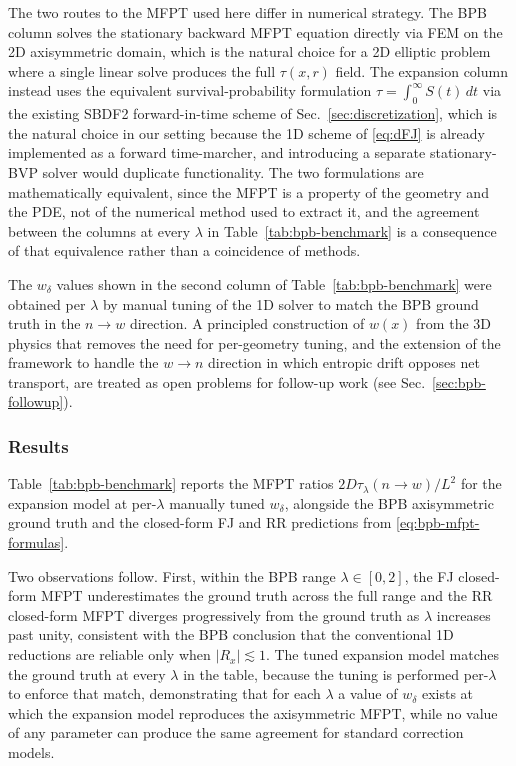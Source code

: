 \documentclass[11pt]{article}
\begin{document}
The two routes to the MFPT used here differ in numerical strategy. The BPB column solves the stationary backward MFPT equation directly via FEM on the 2D axisymmetric domain, which is the natural choice for a 2D elliptic problem where a single linear solve produces the full $\tau(x, r)$ field. The expansion column instead uses the equivalent survival-probability formulation $\tau = \int_0^\infty S(t)\, dt$ via the existing SBDF2 forward-in-time scheme of Sec.~\ref{sec:discretization}, which is the natural choice in our setting because the 1D scheme of \eqref{eq:dFJ} is already implemented as a forward time-marcher, and introducing a separate stationary-BVP solver would duplicate functionality. The two formulations are mathematically equivalent, since the MFPT is a property of the geometry and the PDE, not of the numerical method used to extract it, and the agreement between the columns at every $\lambda$ in Table~\ref{tab:bpb-benchmark} is a consequence of that equivalence rather than a coincidence of methods.

The $w_\delta$ values shown in the second column of Table~\ref{tab:bpb-benchmark} were obtained per $\lambda$ by manual tuning of the 1D solver to match the BPB ground truth in the $n \to w$ direction. A principled construction of $w(x)$ from the 3D physics that removes the need for per-geometry tuning, and the extension of the framework to handle the $w \to n$ direction in which entropic drift opposes net transport, are treated as open problems for follow-up work (see Sec.~\ref{sec:bpb-followup}).

\subsubsection{Results}

Table~\ref{tab:bpb-benchmark} reports the MFPT ratios $2D \tau_\lambda(n \to w)/L^2$ for the expansion model at per-$\lambda$ manually tuned $w_\delta$, alongside the BPB axisymmetric ground truth and the closed-form FJ and RR predictions from \eqref{eq:bpb-mfpt-formulas}.

Two observations follow. First, within the BPB range $\lambda \in [0, 2]$, the FJ closed-form MFPT underestimates the ground truth across the full range and the RR closed-form MFPT diverges progressively from the ground truth as $\lambda$ increases past unity, consistent with the BPB conclusion that the conventional 1D reductions are reliable only when $|R_x| \lesssim 1$. The tuned expansion model matches the ground truth at every $\lambda$ in the table, because the tuning is performed per-$\lambda$ to enforce that match, demonstrating that for each $\lambda$ a value of $w_\delta$ exists at which the expansion model reproduces the axisymmetric MFPT, while no value of any parameter can produce the same agreement for standard correction models.
\end{document}
